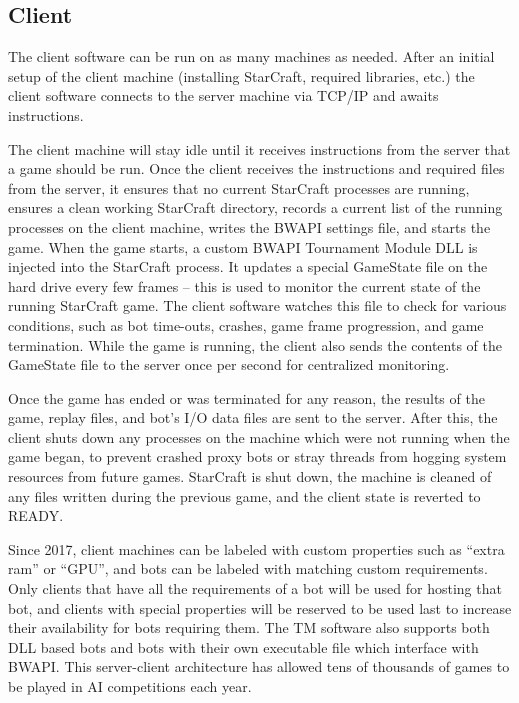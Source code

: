 \subsection{Client}

The client software can be run on as many machines as needed. After an initial setup of the client machine (installing StarCraft, required libraries, etc.) the client software connects to the server machine via TCP/IP and awaits instructions.

The client machine will stay idle until it receives instructions from the server that a game should be run. Once the client receives the instructions and required files from the server, it ensures that no current StarCraft processes are running, ensures a clean working StarCraft directory, records a current list of the running processes on the client machine, writes the BWAPI settings file, and starts the game. When the game starts, a custom BWAPI Tournament Module DLL is injected into the StarCraft process. It updates a special GameState file on the hard drive every few frames -- this is used to monitor the current state of the running StarCraft game. The client software watches this file to check for various conditions, such as bot time-outs, crashes, game frame progression, and game termination. While the game is running, the client also sends the contents of the GameState file to the server once per second for centralized monitoring.

Once the game has ended or was terminated for any reason, the results of the game, replay files, and bot's I/O data files are sent to the server. After this, the client shuts down any processes on the machine which were not running when the game began, to prevent crashed proxy bots or stray threads from hogging system resources from future games. StarCraft is shut down, the machine is cleaned of any files written during the previous game, and the client state is reverted to READY.

Since 2017, client machines can be labeled with custom properties such as “extra ram” or “GPU”, and bots can be labeled with matching custom requirements. Only clients that have all the requirements of a bot will be used for hosting that bot, and clients with special properties will be reserved to be used last to increase their availability for bots requiring them. The TM software also supports both DLL based bots and bots with their own executable file which interface with BWAPI. This server-client architecture has allowed tens of thousands of games to be played in AI competitions each year.
